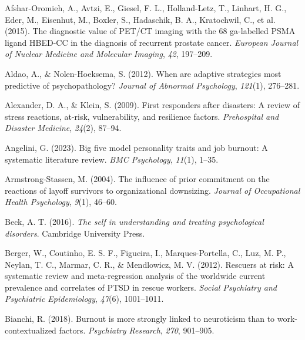 \documentclass[
  man]{apa7}
\newlength{\cslhangindent}
\newlength{\cslentryspacingunit} %
\newenvironment{CSLReferences}[2] %
 {%
  \setlength{\parindent}{0pt}
  \ifodd #1
  \let\oldpar\par
  \def\par{\hangindent=\cslhangindent\oldpar}
  \fi
  \setlength{\parskip}{#2\cslentryspacingunit}
 }%
 {}
\begin{document}
\hypertarget{refs}{}
\begin{CSLReferences}{1}{0}
\leavevmode{}%
Afshar-Oromieh, A., Avtzi, E., Giesel, F. L., Holland-Letz, T., Linhart, H. G., Eder, M., Eisenhut, M., Boxler, S., Hadaschik, B. A., Kratochwil, C., et al. (2015). The diagnostic value of PET/CT imaging with the 68 ga-labelled PSMA ligand HBED-CC in the diagnosis of recurrent prostate cancer. \emph{European Journal of Nuclear Medicine and Molecular Imaging}, \emph{42}, 197--209.

\leavevmode{}%
Aldao, A., \& Nolen-Hoeksema, S. (2012). When are adaptive strategies most predictive of psychopathology? \emph{Journal of Abnormal Psychology}, \emph{121}(1), 276--281.

\leavevmode{}%
Alexander, D. A., \& Klein, S. (2009). First responders after disasters: A review of stress reactions, at-risk, vulnerability, and resilience factors. \emph{Prehospital and Disaster Medicine}, \emph{24}(2), 87--94.

\leavevmode{}%
Angelini, G. (2023). Big five model personality traits and job burnout: A systematic literature review. \emph{BMC Psychology}, \emph{11}(1), 1--35.

\leavevmode{}%
Armstrong-Stassen, M. (2004). The influence of prior commitment on the reactions of layoff survivors to organizational downsizing. \emph{Journal of Occupational Health Psychology}, \emph{9}(1), 46--60.

\leavevmode{}%
Beck, A. T. (2016). \emph{The self in understanding and treating psychological disorders}. Cambridge University Press.

\leavevmode{}%
Berger, W., Coutinho, E. S. F., Figueira, I., Marques-Portella, C., Luz, M. P., Neylan, T. C., Marmar, C. R., \& Mendlowicz, M. V. (2012). Rescuers at risk: A systematic review and meta-regression analysis of the worldwide current prevalence and correlates of PTSD in rescue workers. \emph{Social Psychiatry and Psychiatric Epidemiology}, \emph{47}(6), 1001--1011.

\leavevmode{}%
Bianchi, R. (2018). Burnout is more strongly linked to neuroticism than to work-contextualized factors. \emph{Psychiatry Research}, \emph{270}, 901--905.


\end{CSLReferences}
\end{document}
